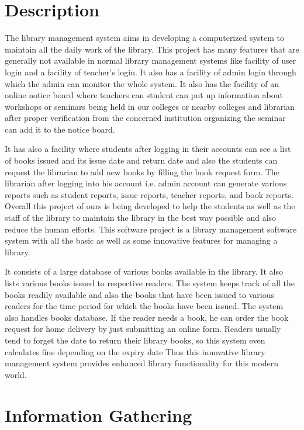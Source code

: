 \section{Description}


The library management system aims in developing a computerized system to maintain all the daily work of the library. This project has many
features that are generally not available in normal library management systems like facility of user login and a facility of teacher’s login. It also has a
facility of admin login through which the admin can monitor the whole system. It also has the facility of an online notice board where teachers can
student can put up information about workshops or seminars being held in our colleges or nearby colleges and librarian after proper verification
from the concerned institution organizing the seminar can add it to the notice board. \par It has also a facility where students after logging in their
accounts can see a list of books issued and its issue date and return date and also the students can request the librarian to add new books by filling
the book request form. The librarian after logging into his account i.e. admin account can generate various reports such as student reports, issue
reports, teacher reports, and book reports. Overall this project of ours is being developed to help the students as well as the staff of the library to
maintain the library in the best way possible and also reduce the human efforts.
This software project is a library management software system with all the basic as well as some innovative features for managing a library. \par It consists of a large database of various books available in the library. It also lists various books issued to respective readers. The system keeps track
of all the books readily available and also the books that have been issued to various readers for the time period for which the books have been
issued. The system also handles books database. If the reader needs a book, he can order the book request for home delivery by just submitting an
online form. Readers usually tend to forget the date to return their library books, so this system even calculates fine depending on the expiry date
Thus this innovative library management system provides enhanced library functionality for this modern world.


\section{Information Gathering}

